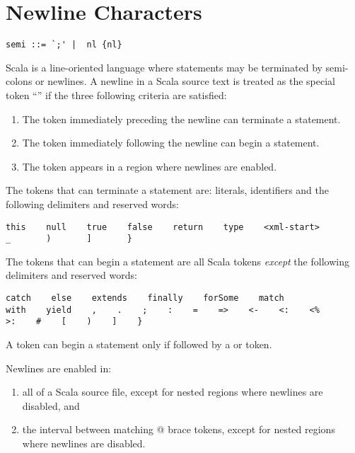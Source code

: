 \section{Newline Characters}\label{sec:newlines}

\syntax\begin{lstlisting}
semi ::= `;' |  nl {nl}
\end{lstlisting}

Scala is a line-oriented language where statements may be terminated by
semi-colons or newlines. A newline in a Scala source text is treated
as the special token ``\lstinline@nl@'' if the three following
criteria are satisfied:
\begin{enumerate}
\item
The token immediately preceding the newline can terminate a statement.
\item
The token immediately following the newline can begin a statement.
\item
The token appears in a region where newlines are enabled.
\end{enumerate}

The tokens that can terminate a statement are: literals, identifiers
and the following delimiters and reserved words:
\begin{lstlisting}
this    null    true    false    return    type    <xml-start>    
_       )       ]       }
\end{lstlisting}

The tokens that can begin a statement are all Scala tokens {\em except}
the following delimiters and reserved words:
\begin{lstlisting}
catch    else    extends    finally    forSome    match        
with    yield    ,    .    ;    :    =    =>    <-    <:    <%    
>:    #    [    )    ]    }
\end{lstlisting}
A \lstinline@case@ token can begin a statement only if followed by a
\lstinline@class@ or \lstinline@object@ token.

Newlines are enabled in:
\begin{enumerate}
\item
all of a Scala source file, except for nested regions where newlines
are disabled, and
\item
the interval between matching @ brace tokens,
except for nested regions where newlines are disabled.
\end{enumerate}

